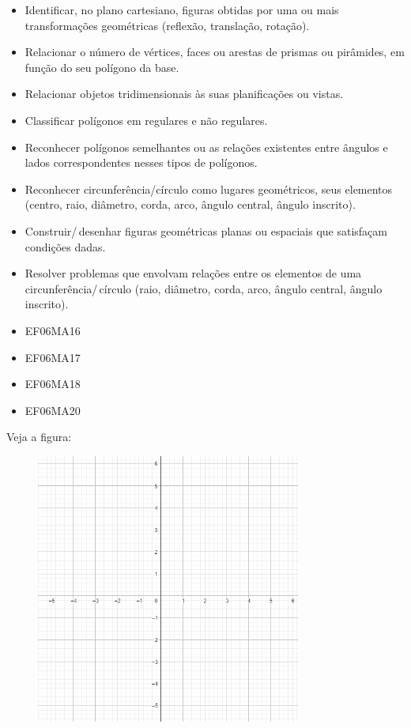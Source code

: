 { 
\begin{itemize}
\item Identificar, no plano cartesiano, figuras obtidas
por uma ou mais transformações geométricas (reflexão, translação,
rotação).
\item
  Relacionar o número de vértices, faces ou arestas de prismas ou
  pirâmides, em função do seu polígono da base.
\item
  Relacionar objetos tridimensionais às suas planificações ou vistas.
\item
  Classificar polígonos em regulares e não regulares.
\item
  Reconhecer polígonos semelhantes ou as relações existentes entre
  ângulos e lados correspondentes nesses tipos de polígonos.
\item
  Reconhecer circunferência/círculo como lugares geométricos, seus
  elementos (centro, raio, diâmetro, corda, arco, ângulo central, ângulo
  inscrito).
\item
  Construir/\,desenhar figuras geométricas planas ou espaciais que
  satisfaçam condições dadas.
\item
  Resolver problemas que envolvam relações entre os elementos de uma
  circunferência/\,círculo (raio, diâmetro, corda, arco, ângulo central,
  ângulo inscrito).
\end{itemize}


\begin{itemize} 
\item  EF06MA16
\item EF06MA17
\item EF06MA18
\item EF06MA20
\end{itemize}


\noindent Veja a figura:

\begin{figure}
\includegraphics[width=3.42575in,height=3.5in]{./imgSAEB_6_MAT/media/image39.png}
\end{figure}

}
